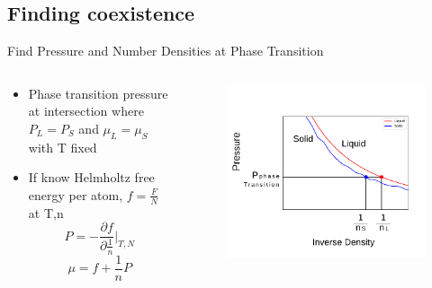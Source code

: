 \documentclass{beamer}
\begin{document}
\subsection*{Finding coexistence}
\begin{frame}{Find Pressure and Number Densities at  Phase Transition}
	\begin{columns}[t]
		\vspace{-2em}
		\begin{block}{}
			\begin{itemize} 
                 \item Phase transition pressure at intersection where $P_L=P_S$ and $\mu_L=\mu_S$ with T fixed							
			    \vspace{+1em}
			    \item If know Helmholtz free energy per atom, $f=\frac{F}{N}$ at T,n
				\begin{displaymath}{P = -\frac{\partial{f}}{\partial{\frac{1}{n}}}\bigg|_{T,N}}\end{displaymath} 
				\begin{displaymath} \mu = f + \frac{1}{n}P\end{displaymath}				
			\end{itemize}
	    \end{block}	    
		\vspace{-3em}
            \begin{figure}
                \centering
                \includegraphics[width=0.9\columnwidth]{figs/MaxwellDTC-Fig3-realplot.pdf}

\end{figure}
\end{columns}
\end{frame}
\end{document}
